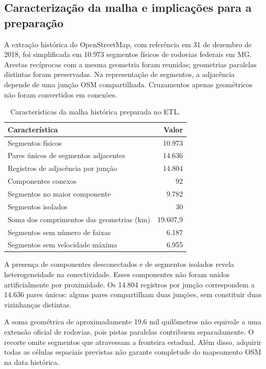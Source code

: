 \documentclass[12pt]{article}
\begin{document}
\clearpage
\subsection{Caracterização da malha e implicações para a preparação}

A extração histórica do OpenStreetMap, com referência em 31 de dezembro
de 2018, foi simplificada em 10.973 segmentos físicos de rodovias
federais em MG. Arestas recíprocas com a mesma geometria foram reunidas;
geometrias paralelas distintas foram preservadas. Na representação de
segmentos, a adjacência depende de uma junção OSM compartilhada.
Cruzamentos apenas geométricos não foram convertidos em conexões.

\begin{table}[!ht]
\centering
\caption{Características da malha histórica preparada no ETL.}
\label{tab:etl-malha}
\small
\begin{tabular}{p{10cm}r}
  \toprule
  \textbf{Característica} & \textbf{Valor} \\
\midrule
Segmentos físicos & 10.973 \\
Pares únicos de segmentos adjacentes & 14.636 \\
Registros de adjacência por junção & 14.804 \\
Componentes conexos & 92 \\
Segmentos no maior componente & 9.782 \\
Segmentos isolados & 30 \\
Soma dos comprimentos das geometrias (km) & 19.607,9 \\
Segmentos sem número de faixas & 6.187 \\
Segmentos sem velocidade máxima & 6.955 \\
\bottomrule
\end{tabular}
\end{table}

A presença de componentes desconectados e de segmentos isolados revela
heterogeneidade na conectividade. Esses componentes não foram unidos
artificialmente por proximidade. Os 14.804 registros por junção
correspondem a 14.636 pares únicos: alguns pares compartilham duas
junções, sem constituir duas vizinhanças distintas.

A soma geométrica de aproximadamente 19,6 mil quilômetros não equivale
a uma extensão oficial de rodovias, pois pistas paralelas contribuem
separadamente. O recorte omite segmentos que atravessam a fronteira
estadual. Além disso, adquirir todas as células espaciais previstas
não garante completude do mapeamento OSM na data histórica.
\end{document}
